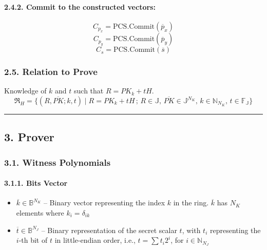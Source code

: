 \documentclass[
]{article}
\begin{document}
\hypertarget{commit-to-the-constructed-vectors}{%
\paragraph{2.4.2. Commit to the constructed
vectors:}\label{commit-to-the-constructed-vectors}}

\[C_{p_x} = \text{PCS.Commit}(\overline{p}_x)\]
\[C_{p_y} = \text{PCS.Commit}(\overline{p}_y)\]
\[C_s = \text{PCS.Commit}(\overline{s})\]

\hypertarget{relation-to-prove}{%
\subsubsection{2.5. Relation to Prove}\label{relation-to-prove}}

Knowledge of \(k\) and \(t\) such that \(R = PK_k + tH\).
\[\mathfrak{R}_H = \{ (R, \overline{PK}; k, t) \mid R = PK_k + tH \,;\, R \in \mathbb{J}, \, \overline{PK} \in \mathbb{J}^{N_K}, \, k \in \mathbb{N}_{N_K}, \, t \in \mathbb{F_J} \}\]

\begin{center}\rule{0.5\linewidth}{0.5pt}\end{center}

\hypertarget{prover}{%
\subsection{3. Prover}\label{prover}}

\hypertarget{witness-polynomials}{%
\subsubsection{3.1. Witness Polynomials}\label{witness-polynomials}}

\hypertarget{bits-vector}{%
\paragraph{3.1.1. Bits Vector}\label{bits-vector}}

\begin{itemize}
\item
  \(\overline{k} \in \mathbb{B}^{N_K}\) -- Binary vector representing
  the index \(k\) in the ring. \(\overline{k}\) has \(N_K\) elements
  where \(k_i = \delta_{ik}\)
\item
  \(\overline{t} \in \mathbb{B}^{N_J}\) -- Binary representation of the
  secret scalar \(t\), with \(t_i\) representing the \(i\)-th bit of
  \(t\) in little-endian order, i.e., \(t = \sum t_i 2^i\), for
  \(i \in \mathbb{N}_{N_J}\)
\end{itemize}
\end{document}

